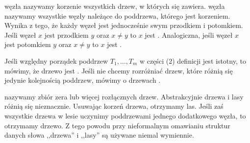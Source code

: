   węzła  nazywamy korzenie wszystkich drzew, w których się zawiera.
  węzła  nazywamy wszystkie węzły należące do poddrzewa, którego jest korzeniem. 
Wynika z tego, że każdy węzeł jest jednocześnie swym przodkiem i potomkiem.
Jeśli węzeł $x$ jest przodkiem $y$ oraz $x \neq y$ to $x$ jest .
Analogiczna, jeśli węzeł $x$ jest potomkiem $y$ oraz $x \neq y$ to $x$ jest .





Jeśli względny porządek poddrzew $T_{1},\ldots, T_{m}$ w części (2) definicji jest istotny,
to mówimy, że drzewo jest  . 
Jeśli nie chcemy rozróżniać drzew, które różnią się jedynie kolejnością poddrzew, mówimy o drzewach .

  nazywamy zbiór zera lub więcej rozłącznych drzew. 
Abstrakcyjnie drzewa i lasy różnią się nieznacznie.
Usuwając korzeń drzewa, otrzymamy las.
Jeśli zaś wszystkie drzewa w lesie uczynimy poddrzewami jednego dodatkowego węzła, to otrzymamy drzewo.
Z tego powodu przy nieformalnym omawianiu struktur danych słowa ,,drzewa'' i ,,lasy'' są używane niemal wymiennie.


